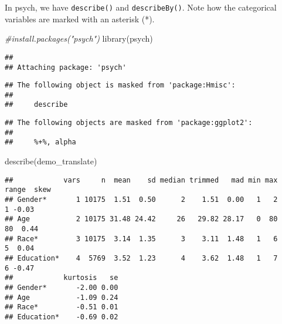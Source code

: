 \documentclass[
]{book}
\newenvironment{Shaded}{\begin{snugshade}}{\end{snugshade}}
\newcommand{\CommentTok}[1]{\textcolor[rgb]{0.56,0.35,0.01}{\textit{#1}}}
\newcommand{\FunctionTok}[1]{\textcolor[rgb]{0.00,0.00,0.00}{#1}}
\newcommand{\NormalTok}[1]{#1}
\newcommand{\SpecialCharTok}[1]{\textcolor[rgb]{0.00,0.00,0.00}{#1}}
\begin{document}
In psych, we have \texttt{describe()} and \texttt{describeBy()}. Note how the categorical variables are marked with an asterisk (*).

\begin{Shaded}
\begin{Highlighting}[]
\CommentTok{\#install.packages("psych")}
\FunctionTok{library}\NormalTok{(psych)}
\end{Highlighting}
\end{Shaded}

\begin{verbatim}
##
## Attaching package: 'psych'
\end{verbatim}

\begin{verbatim}
## The following object is masked from 'package:Hmisc':
##
##     describe
\end{verbatim}

\begin{verbatim}
## The following objects are masked from 'package:ggplot2':
##
##     %+%, alpha
\end{verbatim}

\begin{Shaded}
\begin{Highlighting}[]
\FunctionTok{describe}\NormalTok{(demo\_translate)}
\end{Highlighting}
\end{Shaded}

\begin{verbatim}
##            vars     n  mean    sd median trimmed   mad min max range  skew
## Gender*       1 10175  1.51  0.50      2    1.51  0.00   1   2     1 -0.03
## Age           2 10175 31.48 24.42     26   29.82 28.17   0  80    80  0.44
## Race*         3 10175  3.14  1.35      3    3.11  1.48   1   6     5  0.04
## Education*    4  5769  3.52  1.23      4    3.62  1.48   1   7     6 -0.47
##            kurtosis   se
## Gender*       -2.00 0.00
## Age           -1.09 0.24
## Race*         -0.51 0.01
## Education*    -0.69 0.02
\end{verbatim}

\begin{Shaded}
\end{Shaded}
\end{document}
